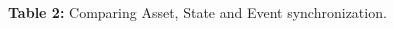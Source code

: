 \documentclass[a0,portrait,svgnames]{a0poster}
\begin{document}
\begin{textblock}{7}
 \begin{center}
\\{\bfseries Table 2:} Comparing Asset, State and Event synchronization.
\end{center}

 


\end{textblock}
\end{document}
